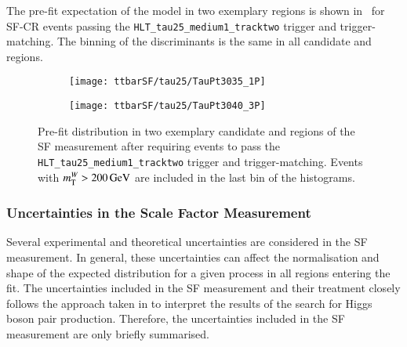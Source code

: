 The pre-fit expectation of the model in two exemplary regions is shown
in~ for SF-CR events passing the
\verb|HLT_tau25_medium1_tracktwo| trigger and trigger-matching. The binning of
the \mTW discriminants is the same in all \tauhadvis candidate \pT and \Ntracks
regions.

\begin{figure}[htbp]
  \centering

  \begin{subfigure}{.48\textwidth}
    \texttt{[image: ttbarSF/tau25/TauPt3035\_1P]}
  \end{subfigure}\hfill%
  \begin{subfigure}{.48\textwidth}
    \texttt{[image: ttbarSF/tau25/TauPt3040\_3P]}
  \end{subfigure}

  \caption[Pre-fit \mTW distribution in two exemplary regions of the SF
  measurement.]{Pre-fit \mTW distribution in two exemplary \tauhadvis candidate
    \Ntracks and \pT regions of the SF measurement after requiring events to
    pass the \texttt{HLT\_tau25\_medium1\_tracktwo} trigger and
    trigger-matching. Events with $m_{\text{T}}^W > \SI{200}{\ensuremath{\text{GeV}}}$ are included in the
    last bin of the histograms.}%
  \label{fig:ttbarsf_mtw_examples_prefit}
\end{figure}


\subsubsection{Uncertainties in the Scale Factor Measurement}

Several experimental and theoretical uncertainties are considered in the SF
measurement. In general, these uncertainties can affect the normalisation and
shape of the expected \mTW distribution for a given process in all regions
entering the fit. The uncertainties included in the SF measurement and their
treatment closely follows the approach taken in
 to interpret the results of
the search for Higgs boson pair production. Therefore, the uncertainties
included in the SF measurement are only briefly summarised.


